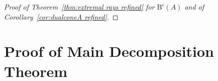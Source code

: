 \documentclass[12pt]{amsart}
\theoremstyle{definition}
\theoremstyle{remark}
\newcommand{\bb}{c}
\newcommand{\BBQ}{\mathrm{B}}
\begin{document}
\begin{proof}[Proof of Theorem~\ref{thm:extremal rays refined} for $\BBQ^{\bb}(A)$ and of Corollary~\ref{cor:dualconeA refined}]
\end{proof}





\section{Proof of Main Decomposition Theorem}\label{sec:refined proof}\label{sec:general case}
\end{document}
